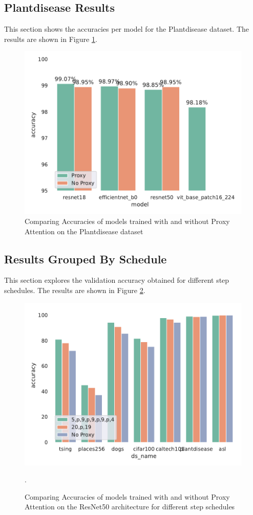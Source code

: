 \subsection{Plantdisease Results}
This section shows the accuracies per model for the Plantdisease dataset. The results are shown in Figure \ref{fig:plantdisease_results}. 
\begin{figure}[H]
    \centering
    \includegraphics[width=.6\linewidth]{results/plantdisease_results.pdf}
    \caption{Comparing Accuracies of models trained with and without Proxy Attention on the Plantdisease dataset}
    \label{fig:plantdisease_results}
\end{figure}


\subsection{Results Grouped By Schedule}
This section explores the validation accuracy obtained for different step schedules. The results are shown in Figure \ref{fig:schedresnet50_results}. 
\begin{figure}[H]
    \centering
    \includegraphics[width=.6\textwidth]{results/schedule_resnet50.pdf}
    \caption{Comparing Accuracies of models trained with and without Proxy Attention on the ResNet50 \cite{heDeepResidualLearning2016} architecture for different step schedules}.
    \label{fig:schedresnet50_results}
\end{figure}

